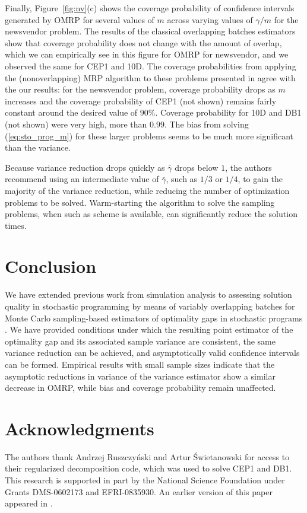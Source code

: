 \documentclass[12pt]{article}
\newcommand{\gammab}{\bar{\gamma}}
\begin{document}
Finally, Figure~\ref{fig:nv}(c) shows the coverage probability of confidence intervals generated by OMRP for several values of $m$ across varying values of $\gamma/m$ for the newsvendor problem.  
The results of the classical overlapping batches estimators show that coverage probability does not change with the amount of overlap, which we can  empirically see in this figure for OMRP for newsvendor, and we observed the same for CEP1 and 10D.  
The coverage probabilities from applying the (nonoverlapping) MRP algorithm to these problems presented in \citep{Bayraksan2006} agree with the our results: for the newsvendor problem, coverage probability drops as $m$ increases and the coverage probability of CEP1 (not shown) remains fairly constant around the desired value of $90\%$. 
Coverage probability for 10D and DB1 (not shown) were very high, more than $0.99$.  The bias from solving (\ref{eq:sto_prog_m}) for these larger problems seems to be much more significant than the variance.

Because variance reduction drops quickly as $\gammab$ drops below $1$, the authors recommend using an intermediate value of $\gammab$, such as $1/3$ or $1/4$, to gain the majority of the variance reduction, while reducing the number of optimization problems to be solved. 
Warm-starting the algorithm to solve the sampling problems, when such as scheme is available, can significantly reduce the solution times.


\section{Conclusion} \label{sec:concl}
We have extended previous work from simulation analysis to assessing solution quality in stochastic programming by means of variably overlapping batches \citep{Meketon1984,Song1992,Welch1987} for Monte Carlo sampling-based estimators of optimality gaps in stochastic programs \citep{Mak1999}. 
We have provided conditions under which the resulting point estimator of the optimality gap and its associated sample variance are consistent, the same variance reduction can be achieved, and asymptotically valid confidence intervals can be formed. 
Empirical results with small sample sizes indicate that the asymptotic reductions in variance of the variance estimator show a similar decrease in OMRP, while bias and coverage probability remain unaffected. 


\section*{Acknowledgments}
The authors thank Andrzej Ruszczy{\'{n}}ski and Artur {\'{S}}wietanowski for
access to their regularized decomposition code, which was used to solve CEP1 and DB1. 
This research is supported
in part by the National Science Foundation under Grants DMS-0602173 and
EFRI-0835930.  
An earlier version of this paper appeared in \citep{love2011overlapping}.
\end{document}
